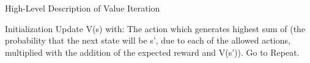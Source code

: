 \begin{algorithm}                                        
\caption{High-Level Description of Value Iteration}          
\label{value_iteration_high_level}                                          
\begin{algorithmic}
    \State Initialization
    \Loop
            \State Update V(s) with: The action which generates highest sum of (the probability that the next state will be s’, due to each of the allowed actions, multiplied with the addition of the expected reward and V(s’)). 
	            \State Go to Repeat.
            \EndIf
        \EndFor
    \EndLoop
\end{algorithmic}
\end{algorithm}

\begin{comment}

Initialization
	Repeat
	For every state s
		Update V(s) with: The action which generates highest sum of (the probability that the next state will be s’, due to each of the allowed actions, multiplied with the addition of the expected reward and V(s’)). 
	If the value function only changed more than a small value then go to Repeat.

\end{comment}